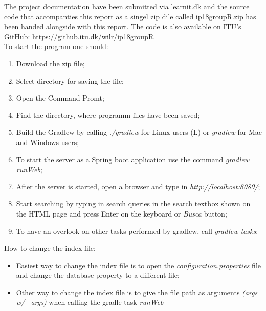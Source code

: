 The project documentation have been submitted via learnit.dk and the source code that accompanties this report as a singel zip dile called ip18groupR.zip has been handed alongside with this report.
The code is also available on ITU's GitHub: https://github.itu.dk/wilr/ip18groupR\\
To start the program one should:
\begin{enumerate}
    \item Download the zip file;
    \item Select directory for saving the file;
    \item Open the Command Promt;
    \item Find the directory, where programm files have been saved;
    \item Build the Gradlew by calling  \textit{./gradlew} for Linux users (L) or \textit{gradlew} for Mac and Windows users;
    \item To start the server as a  Spring boot application use the command \textit{gradlew runWeb};
    \item After the server is started, open a browser and type in \textit{http://localhost:8080/};
    \item Start searching by typing in search queries in the search textbox shown on the HTML page and press Enter on the keyboard or \textit{Busca} button;
    \item To have an overlook on other tasks performed by gradlew, call \textit{gradlew tasks};
\end{enumerate}

How to change the index file:
\begin{itemize}
    \item Easiest way to change the index file is to open the \textit{configuration.properties} file and change the database property to a different file;
    \item Other way to change the index file is to give the file path as arguments \textit{(args w/ --args)} when calling the gradle task \textit{runWeb}
\end{itemize}

